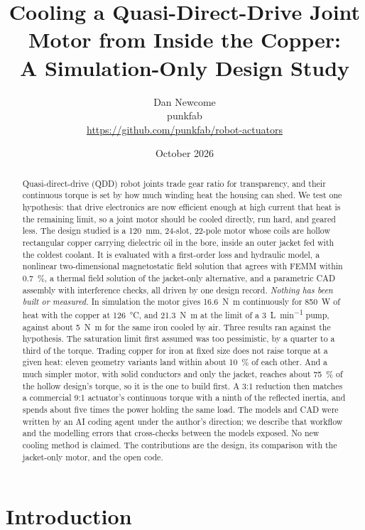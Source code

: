 \documentclass[11pt]{article}
\title{\textbf{Cooling a Quasi-Direct-Drive Joint Motor from Inside the Copper:\\
A Simulation-Only Design Study}}
\author{Dan Newcome\\[2pt]
  \small punkfab\\
  \small\url{https://github.com/punkfab/robot-actuators}}
\date{October 2026}
\newcommand{\Nm}{\si{N.m}}
\begin{document}
\maketitle

\begin{abstract}
Quasi-direct-drive (QDD) robot joints trade gear ratio for transparency, and
their continuous torque is set by how much winding heat the housing can shed.
We test one hypothesis: that drive electronics are now efficient enough at
high current that heat is the remaining limit, so a joint motor should be cooled
directly, run hard, and geared less. The design studied is a
\diameter\SI{120}{mm}, 24-slot, 22-pole motor whose coils are hollow rectangular
copper carrying dielectric oil in the bore, inside an outer jacket fed with the
coldest coolant. It is evaluated with a first-order loss and hydraulic model, a
nonlinear two-dimensional magnetostatic field solution that agrees with FEMM
within \SI{0.7}{\percent}, a thermal field solution of the jacket-only
alternative, and a parametric CAD assembly with interference checks, all
driven by one design record.
\emph{Nothing has been built or measured.} In simulation the motor gives
\SI{16.6}{\Nm} continuously for \SI{850}{W} of heat with the copper at
\SI{126}{\celsius}, and \SI{21.3}{\Nm} at the limit of a
\SI{3}{L\per\minute} pump, against about \SI{5}{\Nm} for the same iron cooled
by air. Three results ran against the hypothesis. The saturation limit
first assumed was too pessimistic, by a quarter to a third of the torque. Trading copper for iron at
fixed size does not raise torque at a given heat: eleven geometry variants land
within about \SI{10}{\percent} of each other. And a much simpler motor, with
solid conductors and only the jacket, reaches about \SI{75}{\percent} of the
hollow design's torque, so it is the one to build first. A
\num{3}:\num{1} reduction then matches a commercial \num{9}:\num{1} actuator's
continuous torque with a ninth of the reflected inertia, and spends about five
times the power holding the same load. The models and CAD were written by an AI coding agent under the
author's direction; we describe that workflow and the modelling errors that
cross-checks between the models exposed. No new cooling method is claimed. The
contributions are the design, its comparison with the jacket-only motor, and
the open code.
\end{abstract}

\section{Introduction}
\label{sec:intro}
\end{document}
